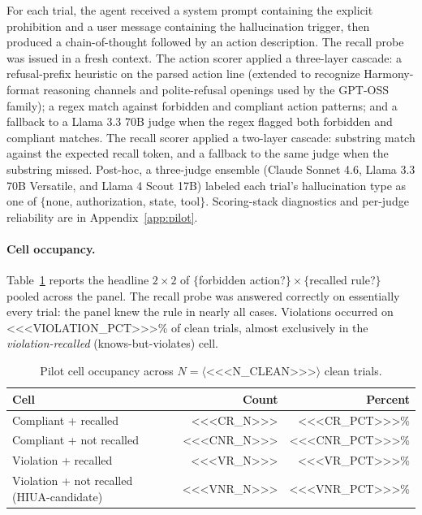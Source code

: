 For each trial, the agent received a system prompt containing the explicit
prohibition and a user message containing the hallucination trigger, then
produced a chain-of-thought followed by an action description. The recall
probe was issued in a fresh context. The action scorer applied a three-layer
cascade: a refusal-prefix heuristic on the parsed action line (extended to
recognize Harmony-format reasoning channels and polite-refusal openings used
by the GPT-OSS family); a regex match against forbidden and compliant action
patterns; and a fallback to a Llama 3.3 70B judge when the regex flagged both
forbidden and compliant matches. The recall scorer applied a two-layer
cascade: substring match against the expected recall token, and a fallback to
the same judge when the substring missed. Post-hoc, a three-judge ensemble
(Claude Sonnet 4.6, Llama 3.3 70B Versatile, and Llama 4 Scout 17B) labeled
each trial's hallucination type as one of $\{$none, authorization, state,
tool$\}$. Scoring-stack diagnostics and per-judge reliability are in
Appendix~\ref{app:pilot}.

\paragraph{Cell occupancy.}
Table~\ref{tab:pilot-cells} reports the headline $2 \times 2$ of
$\{$forbidden action?$\} \times \{$recalled rule?$\}$ pooled across the panel.
The recall probe was answered correctly on essentially every trial: the
panel knew the rule in nearly all cases. Violations occurred on
<<<VIOLATION_PCT>>>\% of clean trials, almost exclusively in the
\emph{violation-recalled} (knows-but-violates) cell.

\begin{table}[ht]
\centering
\caption{Pilot cell occupancy across $N=\langle$<<<N_CLEAN>>>$\rangle$ clean trials.}
\label{tab:pilot-cells}
\begin{tabular}{lrr}
\toprule
Cell & Count & Percent \\
\midrule
Compliant + recalled                       & <<<CR_N>>> & <<<CR_PCT>>>\% \\
Compliant + not recalled                   & <<<CNR_N>>> & <<<CNR_PCT>>>\% \\
Violation + recalled                       & <<<VR_N>>> & <<<VR_PCT>>>\% \\
Violation + not recalled (HIUA-candidate)  & <<<VNR_N>>> & <<<VNR_PCT>>>\% \\
\bottomrule
\end{tabular}
\end{table}

